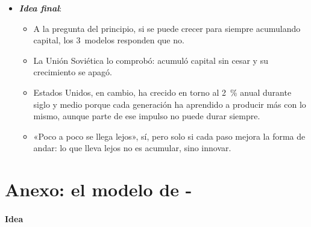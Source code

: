 \documentclass[11pt]{article}
\begin{document}
\begin{itemize}
\begin{itemize}
  \item Esa conclusión negativa es su gran aportación, porque obliga a mirar a la productividad. Como escribió  en 1990, «la productividad no lo es todo, pero a largo plazo es casi todo»\footnote{«Productivity isn't everything, but in the long run it is almost everything», en \textcite{Krugman1990Age}.}.
  \end{itemize}
\item \textbf{\emph{Idea final}}:
  \begin{itemize}
  \item A la pregunta del principio, si se puede crecer para siempre acumulando capital, los 3~modelos responden que no.

  \item La Unión Soviética lo comprobó: acumuló capital sin cesar y su crecimiento se apagó.

  \item Estados Unidos, en cambio, ha crecido en torno al 2~\% anual durante siglo y medio porque cada generación ha aprendido a producir más con lo mismo, aunque parte de ese impulso no puede durar siempre\nocite{Jones2023}.

  \item «Poco a poco se llega lejos», sí, pero solo si cada paso mejora la forma de andar: lo que lleva lejos no es acumular, sino innovar.
  \end{itemize}
\end{itemize}

\clearpage
\appendix

\section{Anexo: el modelo de -}\label{anexo:harrod-domar}

\paragraph{Idea}
\end{document}
